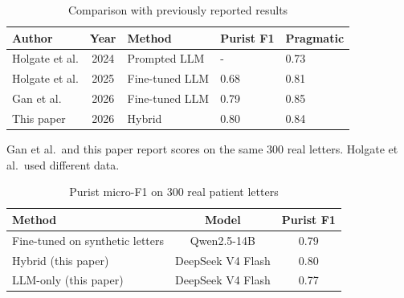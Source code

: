 \documentclass[conference]{IEEEtran}
\begin{document}
\begin{table}[!t]
\caption{Comparison with previously reported results}
\label{tab:historical}
\centering
\begin{tabularx}{\linewidth}{Yclll}
\toprule
\textbf{Author} & \textbf{Year} & \textbf{Method} & \textbf{Purist F1} & \textbf{Pragmatic} \\
\midrule
Holgate et al. & 2024 & Prompted LLM & - & 0.73 \\
Holgate et al. & 2025 & Fine-tuned LLM & 0.68 & 0.81 \\
Gan et al. & 2026 & Fine-tuned LLM & 0.79 & 0.85 \\
\midrule
This paper & 2026 & Hybrid & 0.80 & 0.84 \\
\bottomrule
\end{tabularx}

\vspace*{2pt}
\begin{minipage}{\linewidth}
\raggedright\footnotesize
Gan et al.\ and this paper report scores on the same 300 real letters. Holgate et al.\ used different data.
\end{minipage}
\end{table}

\begin{table}[!t]
\caption{Purist micro-F1 on 300 real patient letters}
\label{tab:real}
\centering
\begin{tabularx}{\linewidth}{Ycc}
\toprule
\textbf{Method} & \textbf{Model} & \textbf{Purist F1} \\
\midrule
Fine-tuned on synthetic letters \cite{b3} & Qwen2.5-14B & 0.79 \\
Hybrid (this paper) & DeepSeek V4 Flash & 0.80 \\
LLM-only (this paper) & DeepSeek V4 Flash & 0.77 \\
\bottomrule
\end{tabularx}

\end{table}
\end{document}

